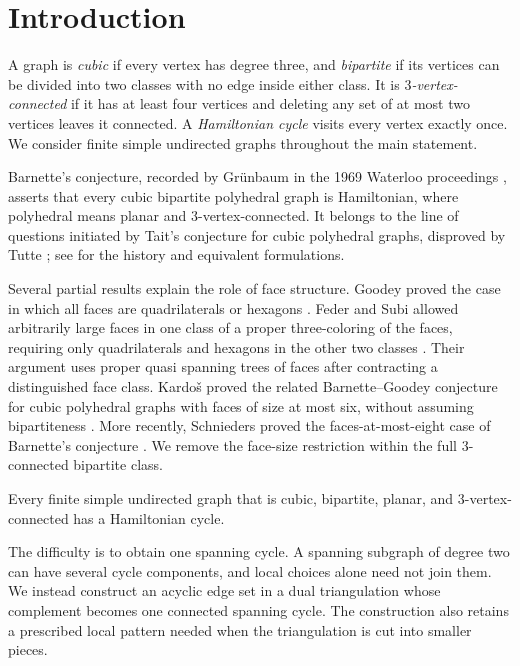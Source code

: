 \begin{abstract}
We prove Barnette's conjecture: every finite simple cubic bipartite planar
\(3\)-vertex-connected graph has a Hamiltonian cycle.
\end{abstract}

\section{Introduction}

A graph is \emph{cubic} if every vertex has degree three, and
\emph{bipartite} if its vertices can be divided into two classes with
no edge inside either class. It is \emph{\(3\)-vertex-connected} if it
has at least four vertices and deleting any set of at most two vertices
leaves it connected. A \emph{Hamiltonian cycle} visits every vertex
exactly once. We consider finite simple undirected graphs throughout
the main statement.

Barnette's conjecture, recorded by Gr\"unbaum in the 1969 Waterloo
proceedings \cite{Barnette1969}, asserts that every cubic bipartite polyhedral
graph is Hamiltonian, where polyhedral means planar and
\(3\)-vertex-connected. It belongs to the line of questions initiated
by Tait's conjecture for cubic polyhedral graphs, disproved by
Tutte \cite{Tutte1946}; see \citet{APSW2016,GSW2023} for the history
and equivalent formulations.

Several partial results explain the role of face structure.
Goodey proved the case in which all faces are quadrilaterals or
hexagons \cite{Goodey1975}. Feder and Subi allowed arbitrarily
large faces in one class of a proper three-coloring of the faces,
requiring only quadrilaterals and hexagons in the other two classes
\cite{FederSubi2006}. Their argument uses proper quasi spanning trees of faces
after contracting a distinguished face class. Kardo\v{s} proved
the related Barnette--Goodey conjecture for cubic polyhedral graphs
with faces of size at most six, without assuming bipartiteness
\cite{Kardos2020}. More recently, Schnieders proved the
faces-at-most-eight case of Barnette's conjecture
\cite[Corollary~1.13]{Schnieders2025}. We remove the face-size
restriction within the full \(3\)-connected bipartite class.

\begin{theorem}\label{thm:main}
Every finite simple undirected graph that is cubic, bipartite,
planar, and \(3\)-vertex-connected has a Hamiltonian cycle.
\end{theorem}

The difficulty is to obtain one spanning cycle. A spanning subgraph
of degree two can have several cycle components, and local choices
alone need not join them. We instead construct an acyclic edge set
in a dual triangulation whose complement becomes one connected
spanning cycle. The construction also retains a prescribed local
pattern needed when the triangulation is cut into smaller pieces.

